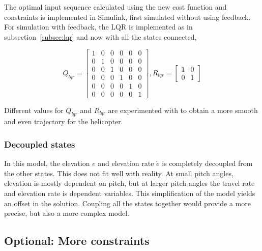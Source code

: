 The optimal input sequence calculated using the new cost function and constraints is implemented in Simulink, first simulated without using feedback. For simulation with feedback, the LQR is implemented as in subsection~\ref{subsec:lqr} and now with all the states connected,

$${Q_{lqr}} = \left[ {\begin{array}{*{20}{c}}
  1&0&0&0&0&0 \\ 
  0&1&0&0&0&0 \\ 
  0&0&1&0&0&0 \\ 
  0&0&0&1&0&0 \\ 
  0&0&0&0&1&0 \\ 
  0&0&0&0&0&1 
\end{array}} \right],{R_{lqr}} = \left[ {\begin{array}{*{20}{c}}
  1&0 \\ 
  0&1 
\end{array}} \right]$$

Different values for $Q_{lqr}$ and $R_{lqr}$ are experimented with to obtain a more smooth and even trajectory for the helicopter. 

\subsubsection{Decoupled states}
In this model, the elevation $e$ and elevation rate $\dot{e}$ is completely decoupled from the other states. This does not fit well with reality. At small pitch angles, elevation is mostly dependent on pitch, but at larger pitch angles the travel rate and elevation rate is dependent variables. This simplification of the model yields an offset in the solution. Coupling all the states together would provide a more precise, but also a more complex model.

\subsection{Optional: More constraints}\label{subsec:constraints}

